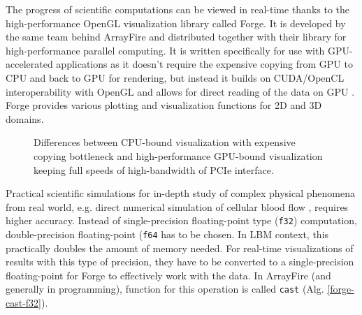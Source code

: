The progress of scientific computations can be viewed in real-time thanks to the high-performance OpenGL visualization library called Forge. It is developed by the same team behind ArrayFire and distributed together with their library for high-performance parallel computing. It is written specifically for use with GPU-accelerated applications as it doesn't require the expensive copying from GPU to CPU and back to GPU for rendering, but instead it builds on CUDA/OpenCL interoperability with OpenGL and allows for direct reading of the data on GPU \cite{forge2016}. Forge provides various plotting and visualization functions for 2D and 3D domains.

\begin{figure}[!ht]
	\centering
	 \qquad
	\caption{Differences between CPU-bound visualization with expensive copying bottleneck and high-performance GPU-bound visualization keeping full speeds of high-bandwidth of PCIe interface.}
	\label{fig:viz-forge-main}
\end{figure}

Practical scientific simulations for in-depth study of complex physical phenomena from real world, e.g. direct numerical simulation of cellular blood flow \cite{kotsalosDigitalBloodMassively2019}, requires higher accuracy. Instead of single-precision floating-point type (\texttt{f32}) computation, double-precision floating-point (\texttt{f64} has to be chosen. In LBM context, this practically doubles the amount of memory needed. For real-time visualizations of results with this type of precision, they have to be converted to a single-precision floating-point for Forge to effectively work with the data. In ArrayFire (and generally in programming), function for this operation is called \texttt{cast} (Alg. \ref{forge-cast-f32}).


